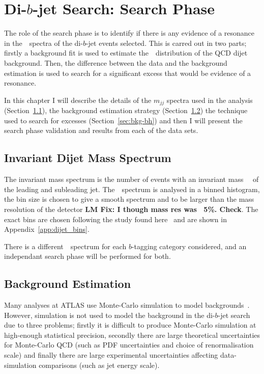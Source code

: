 \chapter{Di-$b$-jet Search: Search Phase}
\label{sec:bkg}

The role of the search phase is to identify
if there is any evidence of a resonance
in the~\mjj~spectra of the di-$b$-jet events selected.
This is carred out in two parts;
firstly a background fit is used to estimate
the~\mjj~distribution of the QCD dijet background.
Then, the difference between the data
and the background estimation is used 
to search 
for a significant excess that would be evidence
of a resonance.

In this chapter
I will describe
the details of the $m_{jj}$ spectra used in the analysis
(Section~\ref{sec:bkg-mjj}),
the background estimation strategy
(Section~\ref{sec:bkg-fit})
the technique used to search for excesses
(Section~\ref{sec:bkg-bh})
and then I will present the search phase
validation and results from each of the data sets.

\section{Invariant Dijet Mass Spectrum}
\label{sec:bkg-mjj}

The invariant mass spectrum is the number of events
with an invariant mass~\mjj~
of the leading and subleading jet.
The~\mjj~spectrum is analysed in a binned histogram,
the bin size is chosen to give a smooth spectrum
and to be larger than the mass resolution of the detector \textbf{LM Fix: I though mass res was ~5\%. Check}.
The exact bins are chosen following the study found here~\cite{dijet-mori16_int}
and are shown in Appendix~\ref{app:dijet_bins}.

There is a different~\mjj~spectrum for each
$b$-tagging category considered,
and an independant search phase will be performed for both.



\section{Background Estimation}
\label{sec:bkg-fit}

Many analyses at ATLAS use Monte-Carlo simulation
to model backgrounds~\cite{obj-Hbb}.
However, simulation is not used to model the
background in the di-$b$-jet search due to three problems;
firstly it is difficult to produce Monte-Carlo simulation at high-enough statistical precision,
secondly there are large theoretical uncertainties for Monte-Carlo QCD
(such as PDF uncertainties and choice of renormalisation scale)
and finally there are large experimental uncertainties affecting
data-simulation comparisons (such as jet energy scale).

